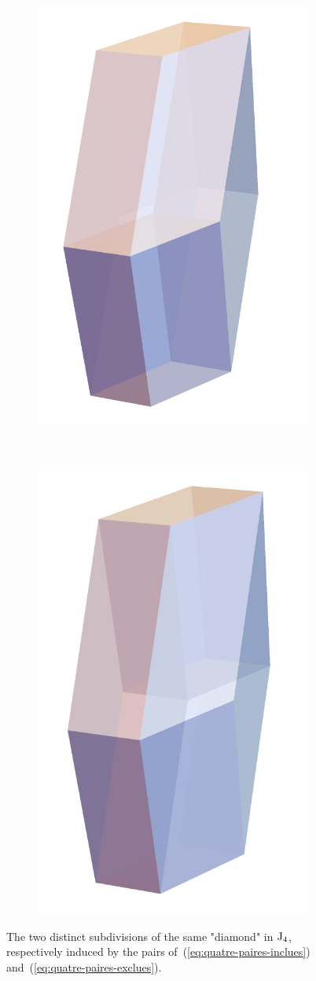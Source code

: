 \documentclass[twoside, 11pt]{amsart}
\theoremstyle{remark}
\begin{document}
\begin{figure}[h!]
\centering
\begin{subfigure}{0.4\textwidth}
    \centering
        \includegraphics[width=0.6\linewidth]{paires-choisies.png} 
    \end{subfigure} ~
    \begin{subfigure}{0.4\textwidth}
    \centering
       \includegraphics[width=0.6\linewidth]{paires-exclues.png}
    \end{subfigure}
\caption{The two distinct subdivisions of the same "diamond" in $\mathrm{J}_4$, respectively induced by the pairs of~(\ref{eq:quatre-paires-inclues}) and~(\ref{eq:quatre-paires-exclues}).}
\label{fig:diamonds}
\end{figure}
\end{document}
